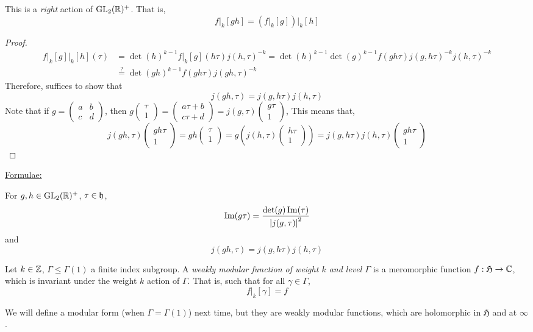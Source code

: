 \documentclass{article}
\newcommand{\mfH}{\mathfrak{H}}
\begin{document}
\begin{lemma}
    This is a \emph{right} action of \(\operatorname{GL}_2(\mathbb{R})^+\). That is,
    \[f\vert_k[gh] = \left(f\vert_k[g]\right)\vert_k[h]\]
\end{lemma}

\begin{proof}
    \begin{align*}
        f\vert_k[g]\vert_k[h](\tau) &= \det(h)^{k-1}f\vert_k[g](h\tau)j(h, \tau)^{-k} = \det(h)^{k-1}\det(g)^{k-1}f(gh\tau)j(g, h\tau)^{-k}j(h, \tau)^{-k} \\
        &\stackrel{?}{=} \det(gh)^{k-1}f(gh\tau)j(gh, \tau)^{-k}
    \end{align*}
    Therefore, suffices to show that
    \[j(gh, \tau) = j(g, h\tau)j(h, \tau)\]
    Note that if \(g = \begin{pmatrix}
        a & b \\ c & d
    \end{pmatrix}\), then \(g \begin{pmatrix}
        \tau \\ 1
    \end{pmatrix} = \begin{pmatrix}
        a\tau + b \\ c\tau + d
    \end{pmatrix} = j(g, \tau)\begin{pmatrix}
        g\tau \\ 1
    \end{pmatrix}\), This means that,
    \[j(gh, \tau)\begin{pmatrix}
        gh\tau \\ 1
    \end{pmatrix} = gh\begin{pmatrix}
        \tau \\ 1
    \end{pmatrix} = g\left(j(h, \tau)\begin{pmatrix}
        h\tau \\ 1
    \end{pmatrix}\right) = j(g, h\tau)j(h, \tau)\begin{pmatrix}
        gh\tau \\ 1
    \end{pmatrix}\]
\end{proof}

\underline{Formulae:}

For \(g, h \in \operatorname{GL}_2(\mathbb{R})^+\), \(\tau \in \mathfrak{h}\),
\[\Im(g\tau) = \frac{\det(g)\Im(\tau)}{\abs{j(g, \tau)}^2}\]
and
\[j(gh, \tau) = j(g, h\tau)j(h, \tau)\]
\begin{definition}
    Let \(k \in \mathbb{Z}\), \(\Gamma \le \Gamma(1)\) a finite index subgroup. A \emph{weakly modular function of weight \(k\) and level \(\Gamma\)} is a meromorphic function \(f : \mfH \to \C\), which is invariant under the weight \(k\) action of \(\Gamma\). That is, such that for all \(\gamma \in \Gamma\),
    \[f\vert_k[\gamma] = f\] 
\end{definition}
We will define a modular form (when \(\Gamma = \Gamma(1)\)) next time, but they are weakly modular functions, which are holomorphic in \(\mfH\) and at \(\infty\).
\end{document}
